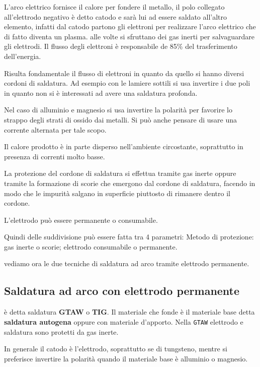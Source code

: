 L'arco elettrico fornisce il calore per fondere il metallo, il polo collegato all'elettrodo negativo è detto catodo e sarà lui ad essere saldato all'altro elemento, infatti dal catodo partono gli elettroni per realizzare l'arco elettrico che di fatto diventa un plasma.
alle volte si sfruttano dei gas inerti per salvaguardare gli elettrodi.
Il flusso degli elettroni è responsabile de 85\% del trasferimento dell'energia. 


Risulta fondamentale il flusso di elettroni in quanto da quello si hanno diversi cordoni di saldatura.
Ad esempio con le lamiere sottili si usa invertire i due poli in quanto non si è interessati ad avere una saldatura profonda.

Nel caso di alluminio e magnesio si usa invertire la polarità per favorire lo strappo degli strati di ossido dai metalli.
Si può anche pensare di usare una corrente alternata per tale scopo.

Il calore prodotto è in parte disperso nell'ambiente circostante, soprattutto in presenza di correnti molto basse.

La protezione del cordone di saldatura si effettua tramite gas inerte oppure tramite la formazione di scorie che emergono dal cordone di saldatura, facendo in modo che le impurità salgano in superficie piuttosto di rimanere dentro il cordone.

L'elettrodo può essere permanente o consumabile.

Quindi delle suddivisione può essere fatta tra 4 parametri: Metodo di protezione: gas inerte o scorie; elettrodo consumabile o permanente.


vediamo ora le due tecniche di saldatura ad arco tramite elettrodo permanente.

\subsection{Saldatura ad arco con elettrodo permanente}
è detta saldatura \textbf{GTAW} o \textbf{TIG}.
Il materiale che fonde è il materiale base detta \textbf{saldatura autogena} oppure con materiale d'apporto.
Nella \texttt{GTAW} elettrodo e saldatura sono protetti da gas inerte.

In generale il catodo è l'elettrodo, soprattutto se di tungsteno, mentre si preferisce invertire la polarità quando il materiale base è alluminio o magnesio.

